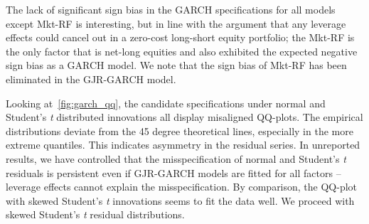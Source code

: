 The lack of significant sign bias in the GARCH specifications for all models except Mkt-RF is interesting, but in line with the argument that any leverage effects could cancel out in a zero-cost long-short equity portfolio; the Mkt-RF is the only factor that is net-long equities and also exhibited the expected negative sign bias as a GARCH model. We note that the sign bias of Mkt-RF has been eliminated in the GJR-GARCH model.

Looking at~\autoref{fig:garch_qq}, the candidate specifications under normal and Student's \textit{t} distributed innovations all display misaligned QQ-plots. The empirical distributions deviate from the 45 degree theoretical lines, especially in the more extreme quantiles. This indicates asymmetry in the residual series. In unreported results, we have controlled that the misspecification of normal and Student's \textit{t} residuals is persistent even if GJR-GARCH models are fitted for all factors -- leverage effects cannot explain the misspecification. By comparison, the QQ-plot with skewed Student's \textit{t} innovations seems to fit the data well. We proceed with skewed Student's \textit{t} residual distributions.

